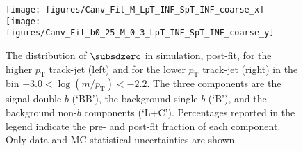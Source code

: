 \documentclass[PAPER, atlasdraft=true, texlive=2016, UKenglish,coverpage]{\ATLASLATEXPATH atlasdoc}
\begin{document}
\begin{figure}[htbp]
  \centering
 \texttt{[image: figures/Canv\_Fit\_M\_LpT\_INF\_SpT\_INF\_coarse\_x]}
 \texttt{[image: figures/Canv\_Fit\_b0\_25\_M\_0\_3\_LpT\_INF\_SpT\_INF\_coarse\_y]}\\
\caption{The distribution of $\subsdzero$ in simulation, post-fit, for the higher $p_\text{T}$ track-jet (left) and for the lower $p_\text{T}$ track-jet (right) in the bin $-3.0<\log(m/p_\text{T})<-2.2$. The three components are the signal double-$b$ (`BB'), the background single $b$ (`B'), and the background non-$b$ components (`L+C').  Percentages reported in the legend indicate the pre- and post-fit fraction of each component.  Only data and MC statistical uncertainties are shown.}
  \label{fig:fits4}
\end{figure}

% 
\end{document}
